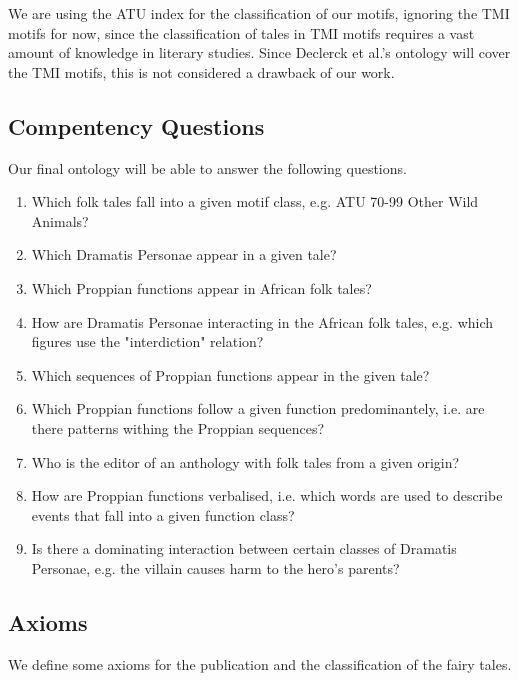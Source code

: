\documentclass[10pt,a4paper]{article}
\begin{document}
We are using the ATU index for the classification of our motifs, ignoring the TMI motifs for now, since the classification of tales in TMI motifs requires a vast amount of  knowledge in literary studies. Since Declerck et al.'s ontology will cover the TMI motifs, this is not considered a drawback of our work. 

	 \subsection{Compentency Questions}
	 Our final ontology will be able to answer the following questions. 
	 
	 	\begin{enumerate}
	 		\item Which folk tales fall into a given motif class, e.g. ATU 70-99 Other Wild Animals? 
	 		\item Which Dramatis Personae appear in a given tale? 
	 		\item Which Proppian functions appear in African folk tales? 
	 		\item How are Dramatis Personae interacting in the African folk tales, e.g. which figures use the "interdiction" relation?
	 		\item Which sequences of Proppian functions appear in the given tale?
	 		\item Which Proppian functions follow a given function predominantely, i.e. are there patterns withing the Proppian sequences? 
	 		\item Who is the editor of an anthology with folk tales from a given origin?
	 		\item How are Proppian functions verbalised, i.e. which words are used to describe events that fall into a given function class? 
	 		\item Is there a dominating interaction between certain classes of Dramatis Personae, e.g. the villain causes harm to the hero's parents?
	 	\end{enumerate}


	\subsection{Axioms}
	\label{axes}
We define some axioms for the publication and the classification of the fairy tales. 
	\small 
\end{document}

